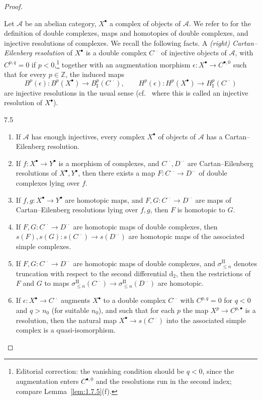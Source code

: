 \begin{proof}
\begin{definition*}
Let $\mathcal{A}$ be an abelian category, $X^\bullet$ a complex of objects of $\mathcal{A}$. We refer to \cite[\nopp Ch.~IV, \S4]{M} for the definition of double complexes, maps and homotopies of double complexes, and injective resolutions of complexes. We recall the following facts.
 A \emph{(right) Cartan--Eilenberg resolution} of $X^\bullet$ is a double complex $C^{\cdot\cdot}$ of injective objects of $\mathcal{A}$, with $C^{p,q}=0$ if $p<0$,\footnote{Editorial correction: the vanishing condition should be $q<0$, since the augmentation enters $C^{\bullet,0}$ and the resolutions run in the second index; compare Lemma~\ref{lem:1.7.5}(f).} together with an augmentation morphism $\epsilon\colon X^\bullet\to C^{\bullet,0}$ such that for every $p\in\mathbb{Z}$, the induced maps
\[
B^p(\epsilon)\colon B^p(X^\bullet) \to B^p_{\mathrm{I}}(C^{\cdot\cdot}),\qquad
H^p(\epsilon)\colon H^p(X^\bullet) \to H^p_{\mathrm{I}}(C^{\cdot\cdot})
\]
are injective resolutions in the usual sense (cf.\ \cite[\nopp Ch.~XVII, \S1]{M} where this is called an injective resolution of $X^\bullet$).
\end{definition*}

\begin{booklemma}{7.5}\label{lem:1.7.5}
\leavevmode
\begin{enumerate}
\item[a)] If $\mathcal{A}$ has enough injectives, every complex $X^\bullet$ of objects of $\mathcal{A}$ has a Cartan--Eilenberg resolution.
\item[b)] If $f\colon X^\bullet\to Y^\bullet$ is a morphism of complexes, and $C^{\cdot\cdot},D^{\cdot\cdot}$ are Cartan--Eilenberg resolutions of $X^\bullet,Y^\bullet$, then there exists a map $F\colon C^{\cdot\cdot}\to D^{\cdot\cdot}$ of double complexes lying over $f$.
\item[c)] If $f,g\colon X^\bullet\to Y^\bullet$ are homotopic maps, and $F,G\colon C^{\cdot\cdot}\to D^{\cdot\cdot}$ are maps of Cartan--Eilenberg resolutions lying over $f,g$, then $F$ is homotopic to $G$.
\item[d)] If $F,G\colon C^{\cdot\cdot}\to D^{\cdot\cdot}$ are homotopic maps of double complexes, then $s(F),s(G)\colon s(C^{\cdot\cdot})\to s(D^{\cdot\cdot})$ are homotopic maps of the associated simple complexes.
\item[e)] If $F,G\colon C^{\cdot\cdot}\to D^{\cdot\cdot}$ are homotopic maps of double complexes, and $\sigma^{\mathrm{II}}_{\le n}$ denotes truncation with respect to the second differential $\mathrm{d}_2$, then the restrictions of $F$ and $G$ to maps $\sigma^{\mathrm{II}}_{\le n}(C^{\cdot\cdot})\to\sigma^{\mathrm{II}}_{\le n}(D^{\cdot\cdot})$ are homotopic.
\item[f)] If $\epsilon\colon X^\bullet\to C^{\cdot\cdot}$ augments $X^\bullet$ to a double complex $C^{\cdot\cdot}$ with $C^{p,q}=0$ for $q<0$ and $q>n_0$ (for suitable $n_0$), and such that for each $p$ the map $X^p\to C^{p,\bullet}$ is a resolution, then the natural map $X^\bullet\to s(C^{\cdot\cdot})$ into the associated simple complex is a quasi-isomorphism.
\end{enumerate}
\end{booklemma}


\end{proof}
